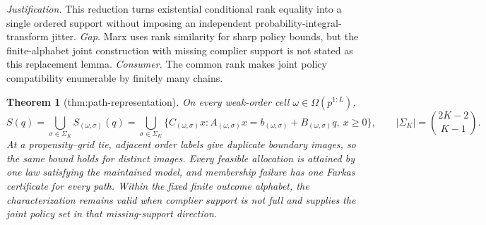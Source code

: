 \documentclass{article}
\newtheorem{theorem}{Theorem}
\begin{document}
\par\smallskip\noindent \textit{Justification.} This reduction turns existential conditional rank equality into a single ordered support without imposing an independent probability-integral-transform jitter. \textit{Gap.} Marx uses rank similarity for sharp policy bounds, but the finite-alphabet joint construction with missing complier support is not stated as this replacement lemma. \textit{Consumer.} The common rank makes joint policy compatibility enumerable by finitely many chains.

\begin{theorem}[thm:path-representation]\label{thm:path-representation}
On every weak-order cell \(\omega\in\Omega(p^{1:L})\), \[S(q)=\bigcup_{\sigma\in\Sigma_K}S_{(\omega,\sigma)}(q)=\bigcup_{\sigma\in\Sigma_K}\{C_{(\omega,\sigma)}x:A_{(\omega,\sigma)}x=b_{(\omega,\sigma)}+B_{(\omega,\sigma)}q,\ x\ge0\},\qquad |\Sigma_K|=\binom{2K-2}{K-1}.\] At a propensity--grid tie, adjacent order labels give duplicate boundary images, so the same bound holds for distinct images. Every feasible allocation is attained by one law satisfying the maintained model, and membership failure has one Farkas certificate for every path. Within the fixed finite outcome alphabet, the characterization remains valid when complier support is not full and supplies the joint policy set in that missing-support direction.
\end{theorem}
\end{document}
